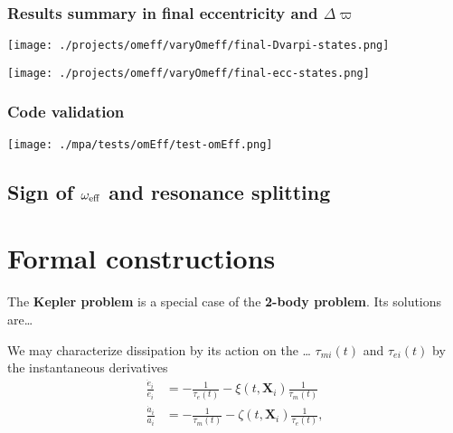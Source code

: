 \documentclass[11pt]{article}
\begin{document}
\subsubsection{Results summary in final eccentricity and \(\Delta\varpi\)}
\label{sec:org37571b7}
\begin{center}
\texttt{[image: ./projects/omeff/varyOmeff/final-Dvarpi-states.png]}
\end{center}

\begin{center}
\texttt{[image: ./projects/omeff/varyOmeff/final-ecc-states.png]}
\end{center}

\subsubsection{Code validation}
\label{sec:orgb52cad1}
\begin{center}
\texttt{[image: ./mpa/tests/omEff/test-omEff.png]}
\end{center}


\subsection{Sign of \(\omega_{\rm eff}\) and resonance splitting}
\label{sec:org0ea4cc3}

\section{Formal constructions}
\label{sec:org76b8484}
The \textbf{Kepler problem} is a special case of the \textbf{2-body problem}.
Its solutions are\ldots{}

We may characterize dissipation by its action on the \ldots{}
\(\tau_{mi}(t)\) and \(\tau_{ei}(t)\) by the instantaneous derivatives
\begin{align}
   \frac{\dot e_i}{e_i} &= - \frac{1}{\tau_e(t)} - \xi(t, \mathbf X_i)\frac{1}{\tau_m(t)} \\
   \frac{\dot a_i}{a_i} &= -\frac{1}{\tau_m(t)} - \zeta(t, \mathbf X_i)\frac{1}{\tau_e(t)},
\end{align}
\noindent
\end{document}
